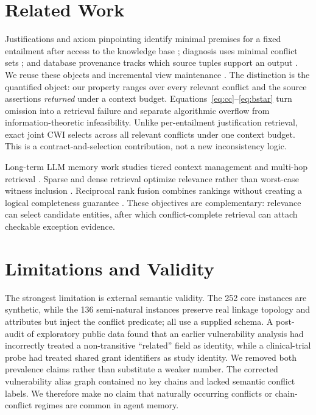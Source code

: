 \documentclass[letterpaper]{article} %
\newcommand{\cwi}{\textsc{CWI}}
\begin{document}
\section{Related Work}

Justifications and axiom pinpointing identify minimal premises for a fixed
entailment after access to the knowledge base
\citep{kalyanpur2007justifications,baader2010pinpointing}; diagnosis
uses minimal conflict sets \citep{reiter1987diagnosis}; and database provenance
tracks which source tuples support an output
\citep{buneman2001whywhere,green2007semirings}.  We reuse these objects and
incremental view maintenance \citep{gupta1993ivm}.  The distinction is the
quantified object: our property ranges over every relevant conflict and the
source assertions \emph{returned} under a context budget.
Equations~\ref{eq:cc}--\ref{eq:bstar} turn omission into a retrieval failure
and separate algorithmic overflow from information-theoretic infeasibility.
Unlike per-entailment justification retrieval, exact joint \cwi{} selects
across all relevant conflicts under one context budget.  This is a
contract-and-selection contribution, not a new inconsistency logic.

Long-term LLM memory work studies tiered context management and multi-hop
retrieval \citep{memgpt2023,hipporag2024}.  Sparse and dense retrieval optimize
relevance rather than worst-case witness inclusion
\citep{robertson2009bm25,reimers2019sbert}.  Reciprocal rank fusion combines
rankings without creating a logical completeness guarantee
\citep{cormack2009rrf}.  These objectives are complementary: relevance can
select candidate entities, after which conflict-complete retrieval can attach
checkable exception evidence.

\section{Limitations and Validity}
\label{sec:limits}

The strongest limitation is external semantic validity.  The 252 core
instances are synthetic, while the 136 semi-natural instances preserve real
linkage topology and attributes but inject the conflict predicate; all use a
supplied schema.  A post-audit of exploratory public
data found that an earlier vulnerability analysis had incorrectly treated a
non-transitive ``related'' field as identity, while a clinical-trial probe had
treated shared grant identifiers as study identity.  We removed both
prevalence claims rather than substitute a weaker number.  The corrected
vulnerability alias graph contained no key chains and lacked semantic conflict
labels.  We therefore make no claim that naturally occurring conflicts or
chain-conflict regimes are common in agent memory.
\end{document}
